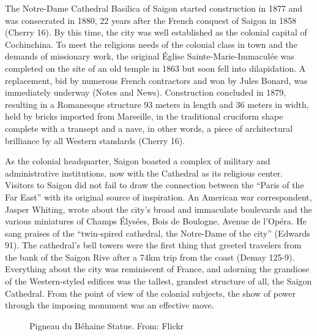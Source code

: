 The Notre-Dame Cathedral Basilica of Saigon started construction in 1877 and was consecrated in 1880, 22 years after the French conquest of Saigon in 1858 (Cherry 16). By this time, the city was well established as the colonial capital of Cochinchina. To meet the religious needs of the colonial class in town and the demands of missionary work, the original Église Sainte-Marie-Immaculée was completed on the site of an old temple in 1863 but soon fell into dilapidation. A replacement, bid by numerous French contractors and won by Jules Bonard, was immediately underway (Notes and News).  Construction concluded in 1879, resulting in a Romanesque structure 93 meters in length and 36 meters in width, held by bricks imported from Marseille, in the traditional cruciform shape complete with a transept and a nave, in other words, a piece of architectural brilliance by all Western standards (Cherry 16).

As the colonial headquarter, Saigon boasted a complex of military and administrative institutions, now with the Cathedral as its religious center. Visitors to Saigon did not fail to draw the connection between the “Paris of the Far East” with its original source of inspiration. An American war correspondent, Jasper Whiting, wrote about the city's broad and immaculate boulevards and the various miniatures of Champs Élysées, Bois de Boulogne, Avenue de l’Opéra. He sang praises of the “twin-spired cathedral, the Notre-Dame of the city” (Edwards 91). The cathedral’s bell towers were the first thing that greeted travelers from the bank of the Saigon Rive after a 74km trip from the coast (Demay 125-9). Everything about the city was reminiscent of France, and adorning the grandiose of the Western-styled edifices was the tallest, grandest structure of all, the Saigon Cathedral. From the point of view of the colonial subjects, the show of power through the imposing monument was an effective move. \en

\begin{figure}[!ht]
\begin{center}
\vspace{-.2 in}
\caption[Pigneau du \vi Béhaine Statue \en]{Pigneau du \vi Béhaine Statue. From: Flickr \en}\label{statue_pigneau}
\end{center}
\vspace{-.2 in}
\end{figure}

